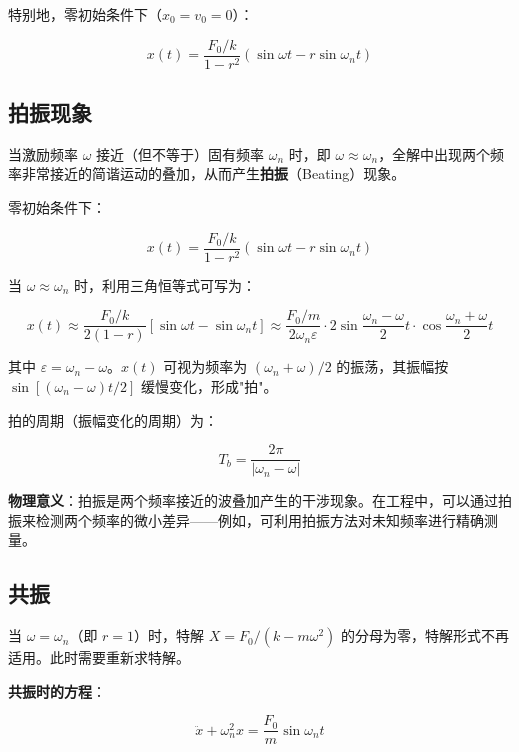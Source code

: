 特别地，零初始条件下（$x_0 = v_0 = 0$）：
\begin{myformula}
    \[
    x(t) = \frac{F_0/k}{1-r^2}\left(\sin\omega t - r\sin\omega_n t\right)
    \]
\end{myformula}

\subsection{拍振现象}

当激励频率 $\omega$ 接近（但不等于）固有频率 $\omega_n$ 时，即 $\omega \approx \omega_n$，全解中出现两个频率非常接近的简谐运动的叠加，从而产生\textbf{拍振}（Beating）现象。

零初始条件下：
\begin{myformula}
    \[
    x(t) = \frac{F_0/k}{1-r^2}(\sin\omega t - r\sin\omega_n t)
    \]
\end{myformula}

当 $\omega \approx \omega_n$ 时，利用三角恒等式可写为：
\begin{myformula}
    \[
    x(t) \approx \frac{F_0/k}{2(1-r)}\left[\sin\omega t - \sin\omega_n t\right]
          \approx \frac{F_0/m}{2\omega_n\varepsilon}\cdot 2\sin\frac{\omega_n - \omega}{2}t\cdot\cos\frac{\omega_n + \omega}{2}t
    \]
\end{myformula}

其中 $\varepsilon = \omega_n - \omega$。$x(t)$ 可视为频率为 $(\omega_n+\omega)/2$ 的振荡，其振幅按 $\sin[(\omega_n-\omega)t/2]$ 缓慢变化，形成"拍"。

拍的周期（振幅变化的周期）为：
\begin{myformula}
    \[
    T_b = \frac{2\pi}{|\omega_n - \omega|}
    \]
\end{myformula}

\textbf{物理意义}：拍振是两个频率接近的波叠加产生的干涉现象。在工程中，可以通过拍振来检测两个频率的微小差异——例如，可利用拍振方法对未知频率进行精确测量。

\subsection{共振}

当 $\omega = \omega_n$（即 $r = 1$）时，特解 $X = F_0/(k - m\omega^2)$ 的分母为零，特解形式不再适用。此时需要重新求特解。

\textbf{共振时的方程}：
\begin{myformula}
    \[
    \ddot{x} + \omega_n^2 x = \frac{F_0}{m}\sin\omega_n t
    \]
\end{myformula}


